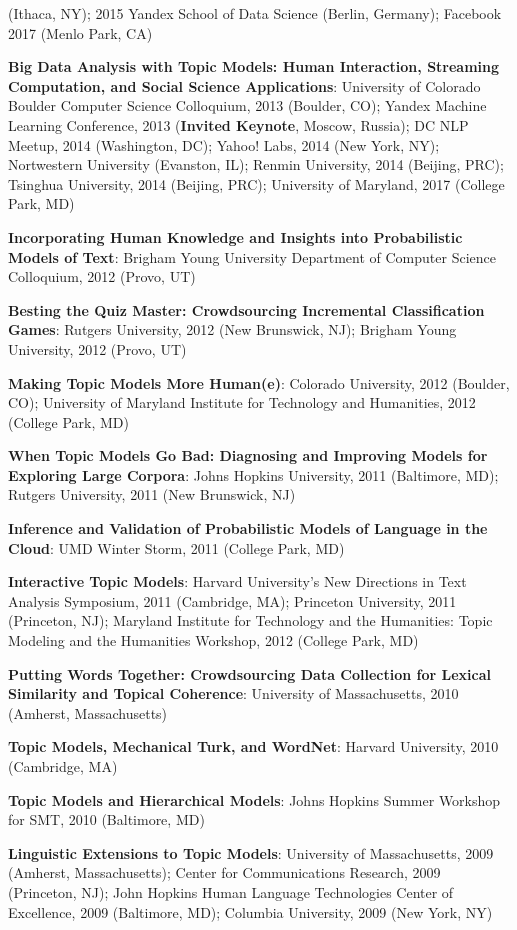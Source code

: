 {{\begin{enumerate*}
(Ithaca, NY); 2015 Yandex School of Data Science (Berlin, Germany);
Facebook 2017 (Menlo Park, CA)
	\item {\bf Big Data Analysis with Topic Models: Human
            Interaction, Streaming Computation, and Social Science
            Applications}: University of Colorado Boulder Computer
          Science Colloquium, 2013 (Boulder, CO); Yandex Machine
          Learning Conference, 2013 ({\bf Invited Keynote}, Moscow,
          Russia); DC NLP Meetup, 2014 (Washington, DC); Yahoo! Labs, 2014 (New
          York, NY); Nortwestern University (Evanston, IL); Renmin
          University, 2014 (Beijing, PRC); Tsinghua University, 2014
          (Beijing, PRC); University of Maryland, 2017 (College Park,
          MD)
	\item {\bf Incorporating Human Knowledge and Insights into Probabilistic Models of Text}: Brigham Young University Department of Computer Science Colloquium, 2012 (Provo, UT)
	\item {\bf Besting the Quiz Master: Crowdsourcing Incremental Classification Games}: Rutgers University, 2012 (New Brunswick, NJ); Brigham Young University, 2012 (Provo, UT)
	\item {\bf Making Topic Models More Human(e)}: Colorado University, 2012 (Boulder, CO); University of Maryland Institute for Technology and Humanities, 2012 (College Park, MD)
	\item {\bf When Topic Models Go Bad: Diagnosing and Improving Models for Exploring Large Corpora}: Johns Hopkins University, 2011 (Baltimore, MD); Rutgers University, 2011 (New Brunswick, NJ)
	\item {\bf Inference and Validation of Probabilistic Models of Language in the Cloud}: UMD Winter Storm, 2011 (College Park, MD)
	\item {\bf Interactive Topic Models}: Harvard University's New
          Directions in Text Analysis Symposium, 2011 (Cambridge, MA);
          Princeton University, 2011 (Princeton, NJ); Maryland
          Institute for Technology and the Humanities: Topic Modeling
          and the Humanities Workshop, 2012 (College Park, MD)
	\item {\bf Putting Words Together: Crowdsourcing Data Collection for Lexical Similarity and Topical Coherence}: University of Massachusetts, 2010 (Amherst, Massachusetts)
	\item {\bf Topic Models, Mechanical Turk, and WordNet}: Harvard University, 2010 (Cambridge, MA)
	\item {\bf Topic Models and Hierarchical Models}: Johns Hopkins Summer Workshop for SMT, 2010 (Baltimore, MD)
	\item {\bf Linguistic Extensions to Topic Models}: University of
          Massachusetts, 2009 (Amherst, Massachusetts); Center for
          Communications Research, 2009 (Princeton, NJ); John Hopkins Human
          Language Technologies Center of Excellence, 2009 (Baltimore, MD); Columbia University, 2009 (New York, NY)
\end{enumerate*}


}
}



